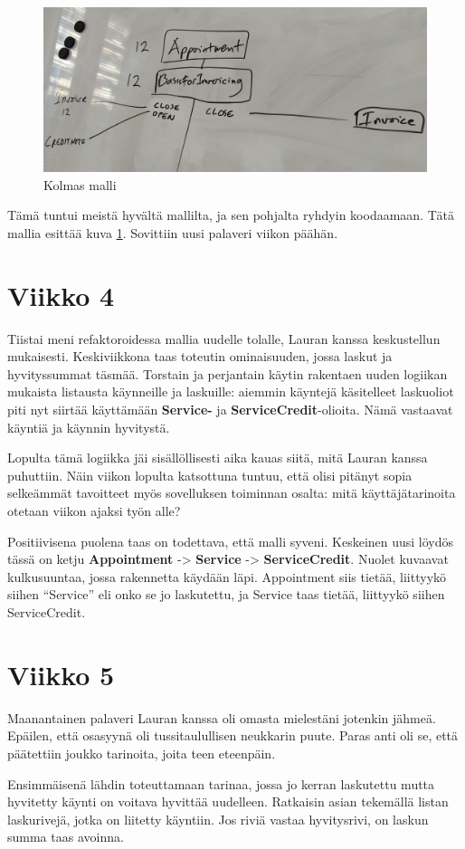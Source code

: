 \begin{figure}
\centering
\includegraphics[width=\textwidth,height=0.5\textheight]{illustration/malli3.jpg}
\caption{\label{malli3}Kolmas malli}
\end{figure}

Tämä tuntui meistä hyvältä mallilta, ja sen pohjalta ryhdyin koodaamaan.
Tätä mallia esittää kuva \ref{malli3}. Sovittiin uusi palaveri viikon
päähän.

\hypertarget{viikko-4}{%
\section{Viikko 4}\label{viikko-4}}

Tiistai meni refaktoroidessa mallia uudelle tolalle, Lauran kanssa
keskustellun mukaisesti. Keskiviikkona taas toteutin ominaisuuden, jossa
laskut ja hyvityssummat täsmää. Torstain ja perjantain käytin rakentaen
uuden logiikan mukaista listausta käynneille ja laskuille: aiemmin
käyntejä käsitelleet laskuoliot piti nyt siirtää käyttämään
\textbf{Service-} ja \textbf{ServiceCredit}-olioita. Nämä vastaavat
käyntiä ja käynnin hyvitystä.

Lopulta tämä logiikka jäi sisällöllisesti aika kauas siitä, mitä Lauran
kanssa puhuttiin. Näin viikon lopulta katsottuna tuntuu, että olisi
pitänyt sopia selkeämmät tavoitteet myös sovelluksen toiminnan osalta:
mitä käyttäjätarinoita otetaan viikon ajaksi työn alle?

Positiivisena puolena taas on todettava, että malli syveni. Keskeinen
uusi löydös tässä on ketju \textbf{Appointment} -\textgreater{}
\textbf{Service} -\textgreater{} \textbf{ServiceCredit}. Nuolet kuvaavat
kulkusuuntaa, jossa rakennetta käydään läpi. Appointment siis tietää,
liittyykö siihen ``Service'' eli onko se jo laskutettu, ja Service taas
tietää, liittyykö siihen ServiceCredit.

\hypertarget{viikko-5}{%
\section{Viikko 5}\label{viikko-5}}

Maanantainen palaveri Lauran kanssa oli omasta mielestäni jotenkin
jähmeä. Epäilen, että osasyynä oli tussitaulullisen neukkarin puute.
Paras anti oli se, että päätettiin joukko tarinoita, joita teen
eteenpäin.

Ensimmäisenä lähdin toteuttamaan tarinaa, jossa jo kerran laskutettu
mutta hyvitetty käynti on voitava hyvittää uudelleen. Ratkaisin asian
tekemällä listan laskurivejä, jotka on liitetty käyntiin. Jos riviä
vastaa hyvitysrivi, on laskun summa taas avoinna.

